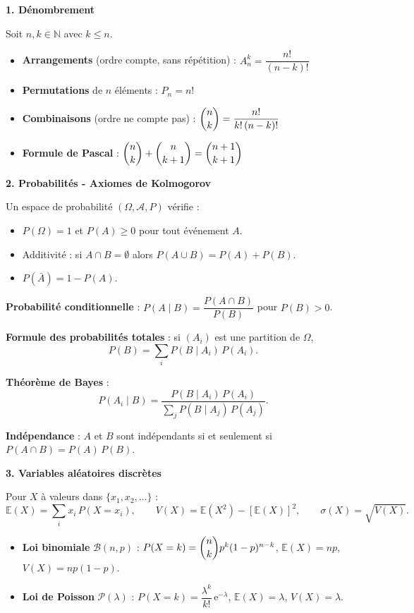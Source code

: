 \documentclass[12pt,a4paper]{article}
\begin{document}
\begin{boiteresume}
\textbf{1. Dénombrement}

Soit $n, k \in \mathbb{N}$ avec $k \leq n$.
\begin{itemize}
  \item \textbf{Arrangements} (ordre compte, sans répétition) : $A_n^k = \dfrac{n!}{(n-k)!}$
  \item \textbf{Permutations} de $n$ éléments : $P_n = n!$
  \item \textbf{Combinaisons} (ordre ne compte pas) : $\dbinom{n}{k} = \dfrac{n!}{k!\,(n-k)!}$
  \item \textbf{Formule de Pascal} : $\dbinom{n}{k} + \dbinom{n}{k+1} = \dbinom{n+1}{k+1}$
\end{itemize}

\medskip
\textbf{2. Probabilités - Axiomes de Kolmogorov}

Un espace de probabilité $(\Omega, \mathcal{A}, P)$ vérifie :
\begin{itemize}
  \item $P(\Omega) = 1$ et $P(A) \geq 0$ pour tout événement $A$.
  \item Additivité : si $A \cap B = \emptyset$ alors $P(A \cup B) = P(A) + P(B)$.
  \item $P(\bar{A}) = 1 - P(A)$.
\end{itemize}

\textbf{Probabilité conditionnelle} : $P(A \mid B) = \dfrac{P(A \cap B)}{P(B)}$ pour $P(B) > 0$.

\textbf{Formule des probabilités totales} : si $(A_i)$ est une partition de $\Omega$,
\[
P(B) = \sum_{i} P(B \mid A_i)\,P(A_i).
\]

\textbf{Théorème de Bayes} :
\[
P(A_i \mid B) = \frac{P(B \mid A_i)\,P(A_i)}{\displaystyle\sum_{j} P(B \mid A_j)\,P(A_j)}.
\]

\textbf{Indépendance} : $A$ et $B$ sont indépendants si et seulement si $P(A \cap B) = P(A)\,P(B)$.

\medskip
\textbf{3. Variables aléatoires discrètes}

Pour $X$ à valeurs dans $\{x_1, x_2, \ldots\}$ :
\[
\mathbb{E}(X) = \sum_i x_i\,P(X=x_i), \qquad
V(X) = \mathbb{E}(X^2) - [\mathbb{E}(X)]^2, \qquad
\sigma(X) = \sqrt{V(X)}.
\]

\begin{itemize}
  \item \textbf{Loi binomiale} $\mathcal{B}(n,p)$ : $P(X=k) = \dbinom{n}{k} p^k (1-p)^{n-k}$, $\mathbb{E}(X)=np$, $V(X)=np(1-p)$.
  \item \textbf{Loi de Poisson} $\mathcal{P}(\lambda)$ : $P(X=k) = \dfrac{\lambda^k}{k!}\,\mathrm{e}^{-\lambda}$, $\mathbb{E}(X)=\lambda$, $V(X)=\lambda$.
\end{itemize}


\end{boiteresume}
\end{document}
